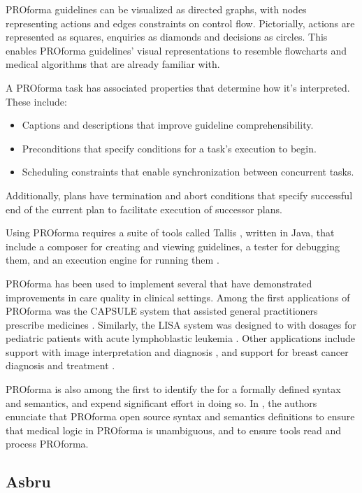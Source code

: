 PROforma guidelines can be visualized as directed graphs, with nodes representing
actions and edges constraints on control flow. Pictorially,
actions are represented as squares, enquiries as diamonds and
decisions as circles. This enables PROforma guidelines' visual representations
to resemble flowcharts and medical algorithms that \HCPs{} are already familiar
with.

A PROforma task has associated properties that determine how it's interpreted.
These include:
\begin{itemize}
  \item Captions and descriptions that improve guideline comprehensibility.
  \item Preconditions that specify conditions for a task's execution to begin.
  \item Scheduling constraints that enable synchronization between concurrent
    tasks.
\end{itemize}
Additionally, plans have termination and abort conditions that specify
successful end of the current plan to facilitate execution of successor
plans.

Using PROforma requires a suite of tools called Tallis \cite{TallisUrl}, written in Java,
that include a composer for creating and viewing guidelines, a tester for
debugging them, and an execution engine for running them \cite{SuttonAMIA03}.

PROforma has been used to implement several \CDSSs{} that have demonstrated
improvements in care quality in clinical settings. Among the first applications
of PROforma was the CAPSULE system that assisted general practitioners prescribe
medicines \cite{WaltonBMJ97}. Similarly, the LISA system was designed to \HCPs{} with
dosages for pediatric patients with acute lymphoblastic leukemia
\cite{BuryBJH05}. Other applications include support with image interpretation
and diagnosis \cite{TaylorMIA99}, and support for breast cancer diagnosis and
treatment \cite{FoxECAI06}.

PROforma is also among the first \DSLs{} to identify the for a formally defined
syntax and semantics, and expend significant effort in doing so.
In \cite{SuttonAMIA03}, the authors enunciate
that PROforma  open source syntax and semantics definitions
to ensure that medical logic in PROforma is unambiguous, and to ensure
tools  read and process PROforma.

\subsection{Asbru}\label{sec:asbru}

